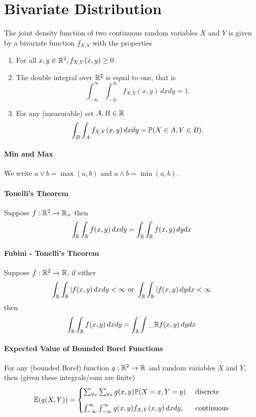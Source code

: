 \section{Bivariate Distribution}
The joint density function of two continuous random variables \(X\) and \(Y\) is given by a bivariate function \(f_{X,Y}\) with the properties
\begin{enumerate}
    \item For all \(x,y \in \mathbb{R}^2, f_{X,Y}(x,y) \geq 0\).
    \item The double integral over \(\mathbb{R}^2\) is equal to one, that is 
    \[\int_{-\infty}^\infty \int_{-\infty}^\infty f_{X,Y}(x,y) \, dxdy = 1.\]
    \item For any (measurable) set \(A,B \in \mathbb{R}\)
    \[\int_B \int_A f_{X,Y}(x,y) \, dxdy = \mathbb{P}(X \in A, Y \in B).\]
\end{enumerate}

\paragraph{Min and Max} 
We write \(a \lor b = \max(a, b)\) and \(a \land b = \min(a, b)\).

\paragraph{Tonelli's Theorem}
Suppose \(f: \mathbb{R}^2 \to \mathbb{R}_+\) then
\[\int_{\mathbb{R}}\int_{\mathbb{R}} f(x,y) \, dxdy = \int_{\mathbb{R}}\int_{\mathbb{R}} f(x,y) \, dydx\]

\paragraph{Fubini - Tonelli's Theorem} 
Suppose \(f: \mathbb{R}^2 \to \mathbb{R}\), if either
\[\int_{\mathbb{R}}\int_{\mathbb{R}} |f(x,y) \, dxdy < \infty \text{ or } \int_{\mathbb{R}}\int_{\mathbb{R}} | f(x,y) \, dydx < \infty\]
then
\[\int_{\mathbb{R}}\int_{\mathbb{R}} f(x,y) \, dxdy = \int_{\mathbb{R}}\int\_\mathbb{R} f(x,y) \, dydx\]

\paragraph{Expected Value of Bounded Borel Functions}
For any (bounded Borel) function \(g: \mathbb{R}^2 \to \mathbb{R}\) and random variables \(X\) and \(Y\), then (given these integrals/sum are finite)
\[\mathbb{E}(g(X,Y)) = \begin{cases}
    \sum_{\forall x}\sum_{\forall x} g(x,y) \mathbb{P}(X=x,Y=y) & \text{ discrete} \\[0.3cm]
    \int_{-\infty}^\infty\int_{-\infty}^\infty g(x,y) f_{X,Y}(x,y) \, dxdy, & \text{ continuous}
\end{cases}
\]

